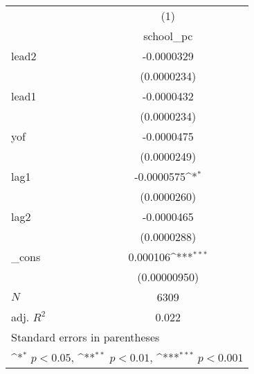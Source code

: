 {
\def\sym#1{\ifmmode^{#1}\else\(^{#1}\)\fi}
\begin{tabular}{l*{1}{c}}
\hline\hline
            &\multicolumn{1}{c}{(1)}\\
            &\multicolumn{1}{c}{school\_pc}\\
\hline
lead2       &  -0.0000329         \\
            & (0.0000234)         \\
[1em]
lead1       &  -0.0000432         \\
            & (0.0000234)         \\
[1em]
yof         &  -0.0000475         \\
            & (0.0000249)         \\
[1em]
lag1        &  -0.0000575\sym{*}  \\
            & (0.0000260)         \\
[1em]
lag2        &  -0.0000465         \\
            & (0.0000288)         \\
[1em]
\_cons      &    0.000106\sym{***}\\
            &(0.00000950)         \\
\hline
\(N\)       &        6309         \\
adj. \(R^{2}\)&       0.022         \\
\hline\hline
\multicolumn{2}{l}{\footnotesize Standard errors in parentheses}\\
\multicolumn{2}{l}{\footnotesize \sym{*} \(p<0.05\), \sym{**} \(p<0.01\), \sym{***} \(p<0.001\)}\\
\end{tabular}
}
